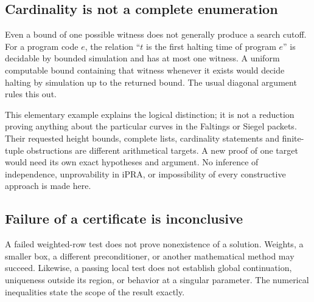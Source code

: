 \subsection{Cardinality is not a complete enumeration}

Even a bound of one possible witness does not generally produce a
search cutoff. For a program code \(e\), the relation ``\(t\) is
the first halting time of program \(e\)'' is decidable by bounded
simulation and has at most one witness. A uniform computable bound
containing that witness whenever it exists would decide halting by
simulation up to the returned bound. The usual diagonal argument
rules this out.

This elementary example explains the logical distinction; it is not
a reduction proving anything about the particular curves in the
Faltings or Siegel packets. Their requested height bounds, complete
lists, cardinality statements and finite-tuple obstructions are
different arithmetical targets. A new proof of one target would
need its own exact hypotheses and argument. No inference of
independence, unprovability in iPRA, or impossibility of every
constructive approach is made here.

\subsection{Failure of a certificate is inconclusive}

A failed weighted-row test does not prove nonexistence of a solution.
Weights, a smaller box, a different preconditioner, or another
mathematical method may succeed. Likewise, a passing local test does
not establish global continuation, uniqueness outside its region,
or behavior at a singular parameter. The numerical inequalities
state the scope of the result exactly.
